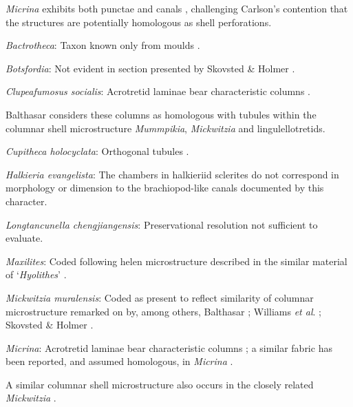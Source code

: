 \documentclass[openany]{book}
\begin{document}
\emph{Micrina} exhibits both punctae and canals
\citep{Harper2017Brachiopodsorigin}, challenging Carlson's contention
\citep[in][]{Williams2007Supplement} that the structures are potentially
homologous as shell perforations.

\hypertarget{Bactrotheca-coding-136}{}
\emph{Bactrotheca}: Taxon known only from moulds \citep{Valent2012}.

\hypertarget{Botsfordia-coding-136}{}
\emph{Botsfordia}: Not evident in section presented by Skovsted \&
Holmer \citeyearpar{Skovsted2003EarlyCambrian}.

\hypertarget{Clupeafumosus_socialis-coding-136}{}
\emph{Clupeafumosus socialis}: Acrotretid laminae bear characteristic
columns \citep[e.g.][]{Zhang2016Epithelialcell}.

Balthasar \citeyearpar{Balthasar2008iMummpikia} considers these columns
as homologous with tubules within the columnar shell microstructure
\emph{Mummpikia}, \emph{Mickwitzia} and lingulellotretids.

\hypertarget{Cupitheca_holocyclata-coding-136}{}
\emph{Cupitheca holocyclata}: Orthogonal tubules \citep{Vendrasco2017}.

\hypertarget{Halkieria_evangelista-coding-136}{}
\emph{Halkieria evangelista}: The chambers in halkieriid sclerites do
not correspond in morphology or dimension to the brachiopod-like canals
documented by this character.

\hypertarget{Longtancunella_chengjiangensis-coding-136}{}
\emph{Longtancunella chengjiangensis}: Preservational resolution not
sufficient to evaluate.

\hypertarget{Maxilites-coding-136}{}
\emph{Maxilites}: Coded following helen microstructure described in the
similar material of `\emph{Hyolithes}' \citep{MartiMus2007}.

\hypertarget{Mickwitzia_muralensis-coding-136}{}
\emph{Mickwitzia muralensis}: Coded as present to reflect similarity of
columnar microstructure remarked on by, among others, Balthasar
\citeyearpar{Balthasar2008iMummpikia}; Williams \emph{et al}.
\citeyearpar{Williams2007Supplement}; Skovsted \& Holmer
\citeyearpar{Skovsted2003EarlyCambrian}.

\hypertarget{Micrina-coding-136}{}
\emph{Micrina}: Acrotretid laminae bear characteristic columns
\citep[e.g.][]{Zhang2016Epithelialcell}; a similar fabric has been
reported, and assumed homologous, in \emph{Micrina}
\citep{Butler2012ConstructingCambrian}.

A similar columnar shell microstructure also occurs in the closely
related \emph{Mickwitzia} \citep{Balthasar2008iMummpikia}.
\end{document}
